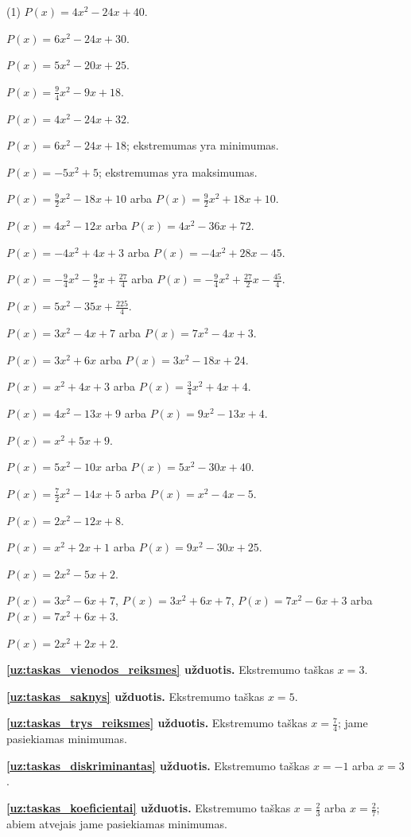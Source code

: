 \documentclass[11pt,a4paper]{scrartcl}
\numberwithin{exercise}{section}
\begin{document}
\begin{tasks}[label=(\arabic*),label-width=2em](1)
\task $P(x)=4x^2-24x+40$.

\task $P(x)=6x^2-24x+30$.

\task $P(x)=5x^2-20x+25$.

\task $P(x)=\frac94x^2-9x+18$.

\task $P(x)=4x^2-24x+32$.

\task $P(x)=6x^2-24x+18$; ekstremumas yra minimumas.

\task $P(x)=-5x^2+5$; ekstremumas yra maksimumas.

\task $P(x)=\frac92x^2-18x+10$
arba $P(x)=\frac92x^2+18x+10$.

\task $P(x)=4x^2-12x$
arba $P(x)=4x^2-36x+72$.

\task $P(x)=-4x^2+4x+3$
arba $P(x)=-4x^2+28x-45$.

\task $P(x)=-\frac94x^2-\frac92x+\frac{27}{4}$
arba $P(x)=-\frac94x^2+\frac{27}{2}x-\frac{45}{4}$.

\task $P(x)=5x^2-35x+\frac{225}{4}$.

\task $P(x)=3x^2-4x+7$
arba $P(x)=7x^2-4x+3$.

\task $P(x)=3x^2+6x$
arba $P(x)=3x^2-18x+24$.

\task $P(x)=x^2+4x+3$
arba $P(x)=\frac34x^2+4x+4$.

\task $P(x)=4x^2-13x+9$
arba $P(x)=9x^2-13x+4$.

\task $P(x)=x^2+5x+9$.

\task $P(x)=5x^2-10x$
arba $P(x)=5x^2-30x+40$.

\task $P(x)=\frac72x^2-14x+5$
arba $P(x)=x^2-4x-5$.

\task $P(x)=2x^2-12x+8$.

\task $P(x)=x^2+2x+1$
arba $P(x)=9x^2-30x+25$.

\task $P(x)=2x^2-5x+2$.

\task $P(x)=3x^2-6x+7$,
$P(x)=3x^2+6x+7$,
$P(x)=7x^2-6x+3$
arba $P(x)=7x^2+6x+3$.

\task $P(x)=2x^2+2x+2$.
\end{tasks}

\medskip
\noindent\textbf{\ref{uz:taskas_vienodos_reiksmes} užduotis.}
Ekstremumo taškas $x=3$.

\medskip
\noindent\textbf{\ref{uz:taskas_saknys} užduotis.}
Ekstremumo taškas $x=5$.

\medskip
\noindent\textbf{\ref{uz:taskas_trys_reiksmes} užduotis.}
Ekstremumo taškas $x=\frac74$; jame pasiekiamas minimumas.

\medskip
\noindent\textbf{\ref{uz:taskas_diskriminantas} užduotis.}
Ekstremumo taškas $x=-1$ arba $x=3$.

\medskip
\noindent\textbf{\ref{uz:taskas_koeficientai} užduotis.}
Ekstremumo taškas $x=\frac23$ arba $x=\frac27$;
abiem atvejais jame pasiekiamas minimumas.
\end{document}
